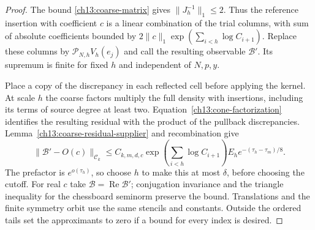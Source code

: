 \begin{proof}
The bound \eqref{ch13:coarse-matrix} gives
$\|J_h^{-1}\|_1\le2$. Thus the reference insertion with coefficient
$c$ is a linear combination of the trial columns, with sum of absolute
coefficients bounded by
$2\|c\|_1\exp(\sum_{i<h}\log C_{i+1})$. Replace these columns by
$\mathcal P_{N,h}V_h(e_j)$ and call the resulting observable
$\mathcal B'$. Its supremum is finite for fixed $h$ and independent
of $N,p,y$.

Place a copy of the discrepancy in each reflected cell before applying the kernel. At scale $h$
the coarse factors multiply the full density with insertions, including its
terms of source degree at least two. Equation~\eqref{ch13:cone-factorization} identifies the
resulting residual with the product of the pullback discrepancies.
Lemma~\ref{ch13:coarse-residual-supplier} and recombination give
\[
 \|\mathcal B'-O(c)\|_{\mathcal C_k}
 \le C_{k,m,d,c}\exp\left(\sum_{i<h}\log C_{i+1}\right)
                       E_h e^{-(\tau_h-\tau_m)/8}.
\]
The prefactor is $e^{o(\tau_h)}$, so choose $h$ to make this at most
$\delta$, before choosing the cutoff. For real $c$ take
$\mathcal B=\operatorname{Re}\mathcal B'$; conjugation invariance
and the triangle inequality for the chessboard seminorm preserve the
bound. Translations and the finite symmetry orbit use the same stencils
and constants. Outside the ordered tails set the approximants to zero
if a bound for every index is desired.
\end{proof}

